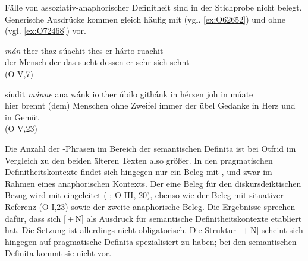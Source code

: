 
Fälle von assoziativ-anaphorischer  Definitheit sind in der Stichprobe nicht belegt. Generische Ausdrücke kommen gleich häufig mit (vgl. \ref{ex:O62652}) und ohne (vgl. \ref{ex:O72468})  vor.

%

\begin{exe}
\ex \label{ex:O62652}  {\textit{mán}} {ther} {thaz} {súachit} {thes} {er} {hárto} {ruachit} \\
{der} {Mensch} {der} {das} {sucht} {dessen} {er} {sehr} {sich sehnt} \\
\glt   {} (O V,7)
%

\ex \label{ex:O72468}  {síudit} {\textit{mánne}} {ana} {wánk} {io} {ther} {úbilo} {githánk} {in} {hérzen} {joh} {in} {múate}  \\
{hier} {brennt} {(dem) Menschen} {ohne} {Zweifel} {immer} {der} {übel} {Gedanke} {in} {Herz} {und} {in} {Gemüt} \\
\glt   {}  (O V,23)
\end{exe}

Die Anzahl der -Phrasen  im Bereich der semantischen Definita  ist bei Otfrid im Vergleich zu den beiden älteren Texten also größer. In den pragmatischen Definitheitskontexte  findet sich hingegen nur ein Beleg mit , und zwar im Rahmen eines anaphorischen  Kontexts. Der eine Beleg für den diskursdeiktischen  Bezug wird mit  eingeleitet ( ; O III, 20), ebenso wie der Beleg mit situativer Referenz    (O I,23) sowie der zweite anaphorische  Beleg. Die Ergebnisse sprechen dafür, dass sich [\,+\,N] als Ausdruck für semantische Definitheitskontexte  etabliert hat. Die Setzung ist allerdings nicht obligatorisch. Die Struktur [\,+\,N] scheint sich hingegen auf pragmatische Definita  spezialisiert zu haben; bei den semantischen Definita  kommt sie nicht vor.

